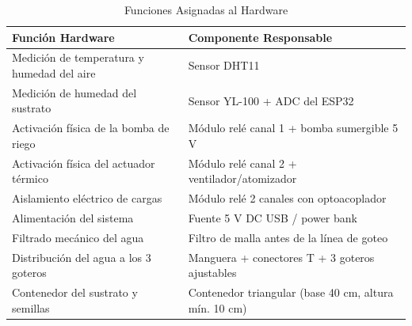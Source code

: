 \begin{table}[tp]
\centering
\renewcommand{\arraystretch}{1.3}
\caption{Funciones Asignadas al Hardware}
\label{tab:funciones_hardware}
\begin{tabularx}{\textwidth}{|X|X|}
\hline
\textbf{Función Hardware} & \textbf{Componente Responsable} \\
\hline
Medición de temperatura y humedad del aire & Sensor DHT11 \\
\hline
Medición de humedad del sustrato & Sensor YL-100 + ADC del ESP32 \\
\hline
Activación física de la bomba de riego & Módulo relé canal 1 + bomba sumergible 5 V \\
\hline
Activación física del actuador térmico & Módulo relé canal 2 + ventilador/atomizador \\
\hline
Aislamiento eléctrico de cargas & Módulo relé 2 canales con optoacoplador \\
\hline
Alimentación del sistema & Fuente 5 V DC USB / power bank \\
\hline
Filtrado mecánico del agua & Filtro de malla antes de la línea de goteo \\
\hline
Distribución del agua a los 3 goteros & Manguera + conectores T + 3 goteros ajustables \\
\hline
Contenedor del sustrato y semillas & Contenedor triangular (base 40 cm, altura mín. 10 cm) \\
\hline
\end{tabularx}
\end{table}